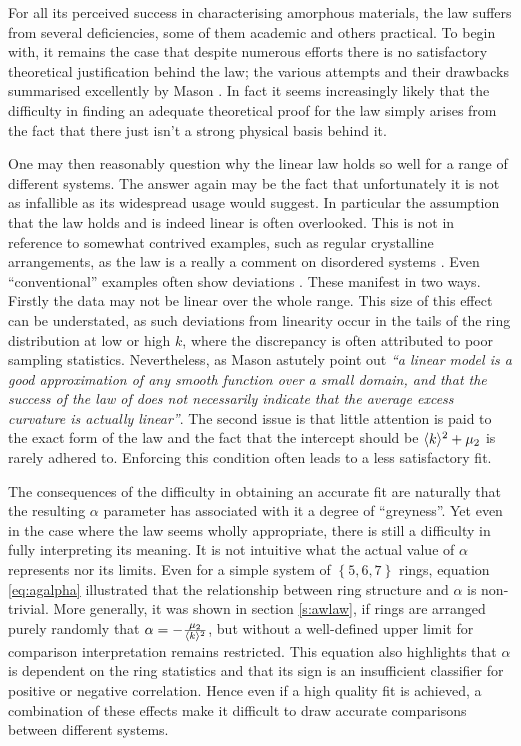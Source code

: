 For all its perceived success in characterising amorphous materials, the \aw{} law suffers from several deficiencies, some of them academic and others practical.
To begin with, it remains the case that despite numerous efforts \cite{Lambert1981,Kumar1994,Blanc1979,Rivier1985,Peshkin1991,Chiu1994} there is no satisfactory theoretical justification behind the \aw{} law; the various attempts and their drawbacks summarised excellently by Mason \etal{} \cite{Mason2012}.
In fact it seems increasingly likely that the difficulty in finding an adequate theoretical proof for the \aw{} law simply arises from the fact that there just isn't a strong physical basis behind it.

One may then reasonably question why the linear \aw{} law holds so well for a range of different systems.
The answer again may be the fact that unfortunately it is not as infallible as its widespread usage would suggest.
In particular the assumption that the law holds and is indeed linear is often overlooked.
This is not in reference to somewhat contrived examples, such as regular crystalline arrangements, as the \aw{} law is a really a comment on disordered systems \cite{Boots1984}.
Even ``conventional'' examples often show deviations \cite{Earnshaw1994,Kumar1994,Hilhorst2006}.
These manifest in two ways.
Firstly the data may not be linear over the whole range.
This size of this effect can be understated, as such deviations from linearity occur in the tails of the ring distribution at low or high $k$, where the discrepancy is often attributed to poor sampling statistics.
Nevertheless, as Mason \etal{} astutely point out \textit{``a linear model is a good approximation of any smooth function over a small domain, and that the success of the law of \aw{} does not necessarily indicate that the average excess curvature is actually linear''}.
The second issue is that little attention is paid to the exact form of the law and the fact that the intercept should be $\langle k \rangle^2+\mu_2$ is rarely adhered to.
Enforcing this condition often leads to a less satisfactory fit. 

The consequences of the difficulty in obtaining an accurate \aw{} fit are naturally that the resulting $\alpha$ parameter has associated with it a degree of ``greyness''.
Yet even in the case where the \aw{} law seems wholly appropriate, there is still a difficulty in fully interpreting its meaning.
It is not intuitive what the actual value of $\alpha$ represents nor its limits.
Even for a simple system of $\left\{5,6,7\right\}$ rings, equation \eqref{eq:agalpha} illustrated that the relationship between ring structure and $\alpha$ is non\--trivial.
More generally, it was shown in section \ref{s:awlaw}, if rings are arranged purely randomly that $\alpha=-\frac{\mu_2}{\langle k \rangle^2}$, but without a well\--defined upper limit for comparison interpretation remains restricted.
This equation also highlights that $\alpha$ is dependent on the ring statistics and that its sign is an insufficient classifier for positive or negative correlation.
Hence even if a high quality fit is achieved, a combination of these effects make it difficult to draw accurate comparisons between different systems.

